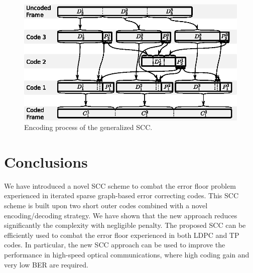 \documentclass[conference]{IEEEtran}
\newcommand{\ScaleA}{1.0} %
\begin{document}
\begin{figure}[t] 
  \centerline{\includegraphics[width=\ScaleA\columnwidth]{figures_sources/drawing_v10_proposed_3_encoder.eps}}%
    \caption{Encoding process of the generalized SCC.}
    \label{fig:pro3enc} 
\end{figure}

\section{Conclusions} \label{sec:concl} 

We have introduced a novel SCC scheme to combat the error floor
problem experienced in iterated sparse graph-based error correcting
codes. This SCC scheme is built upon two short outer codes combined
with a novel encoding/decoding strategy. We have shown that the new
approach reduces significantly the complexity with negligible
penalty. The proposed SCC can be efficiently used to combat the error
floor experienced in both LDPC and TP codes. In particular, the new
SCC approach can be used to improve the performance in high-speed
optical communications, where high coding gain and very low BER are
required.




 
\end{document}
